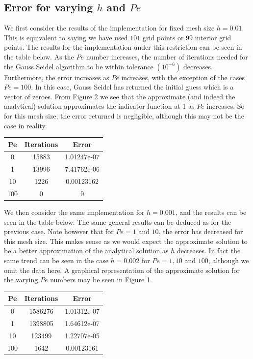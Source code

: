 \documentclass[10pt]{article}
\begin{document}
\subsection{Error for varying $h$ and $Pe$}
We first consider the results of the implementation for fixed mesh size $h = 0.01$. This is equivalent to saying we have used $101$ grid points or $99$ interior grid points. The results for the implementation under this restriction can be seen in the table below. As the $Pe$ number increases, the number of iterations needed for the Gauss Seidel algorithm to be within tolerance $( 10^{-6} )$ decreases. Furthermore, the error increases as $Pe$ increases, with the exception of the cases $Pe =100$. In this case, Gauss Seidel has returned the initial guess which is a vector of zeroes. From Figure 2 we see that the approximate (and indeed the analytical) solution approximates the indicator function at 1 as $Pe$ increases. So for this mesh size, the error returned is negligible, although this may not be the case in reality.
\begin{center}
 \begin{tabular}{||c c c ||}
 \hline
 Pe & Iterations & Error \\ [0.5ex]
 \hline\hline
 0 & 15883 & 1.01247e-07  \\
 \hline
 1 & 13996 & 7.41762e-06   \\
 \hline
 10 & 1226 & 0.00123162  \\
 \hline
 100 & 0 & 0 \\
 \hline
\end{tabular}
\end{center}

We then consider the same implementation for $h = 0.001$, and the results can be seen in the table below. The same general results can be deduced as for the previous case.  Note however that for $Pe =1$ and $10$, the error has decreased for this mesh size. This makes sense as we would expect the approximate solution to be a better approximation of the analytical solution as $h$ decreases. In fact the same trend can be seen in the case $h=0.002$ for $Pe = 1,10$ and $100$, although we omit the data here. A graphical representation of the approximate solution for the varying $Pe$ numbers may be seen in Figure 1.
\begin{center}
 \begin{tabular}{||c c c ||}
 \hline
 Pe & Iterations & Error \\ [0.5ex]
 \hline\hline
 0 & 1586276 & 1.01312e-07  \\
 \hline
 1 & 1398805 & 1.64612e-07   \\
 \hline
 10 & 123499 & 1.22707e-05  \\
 \hline
 100 & 1642 & 0.00123161 \\
 \hline
\end{tabular}
\end{center}
\end{document}
